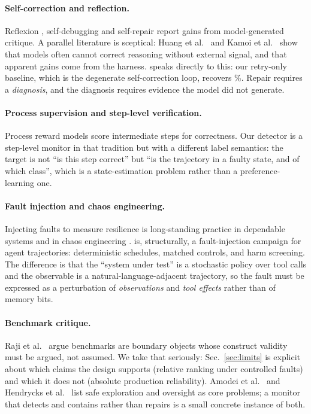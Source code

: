 \paragraph{Self-correction and reflection.} Reflexion \citep{shinn2023reflexion}, self-debugging
\citep{chen2024selfdebug} and self-repair \citep{olausson2024selfrepair} report gains from
model-generated critique. A parallel literature is sceptical: Huang et al.~\citep{huang2024selfcorrect} and Kamoi et al.~\citep{kamoi2024selfcorrection} show that models often cannot correct reasoning without external
signal, and that apparent gains come from the harness. \arb{} speaks directly to this: our
retry-only baseline, which is the degenerate self-correction loop, recovers \RecRetry\%. Repair
requires a \emph{diagnosis}, and the diagnosis requires evidence the model did not generate.

\paragraph{Process supervision and step-level verification.} Process reward models
\citep{lightman2023prm,uesato2022safety,cobbe2021gsm8k} score intermediate steps for correctness.
Our detector is a step-level monitor in that tradition but with a different label semantics: the
target is not ``is this step correct'' but ``is the trajectory in a faulty state, and of which
class'', which is a state-estimation problem rather than a preference-learning one.

\paragraph{Fault injection and chaos engineering.} Injecting faults to measure resilience is
long-standing practice in dependable systems \citep{hsueh1997fault,scully2015fault} and in chaos
engineering \citep{basiri2016chaos,lightstone2004chaos}. \arb{} is, structurally, a fault-injection
campaign for agent trajectories: deterministic schedules, matched controls, and harm screening. The
difference is that the ``system under test'' is a stochastic policy over tool calls and the
observable is a natural-language-adjacent trajectory, so the fault must be expressed as a
perturbation of \emph{observations} and \emph{tool effects} rather than of memory bits.

\paragraph{Benchmark critique.} Raji et al.~\citep{raji2021ai} argue benchmarks are boundary objects whose
construct validity must be argued, not assumed. We take that seriously: Sec.~\ref{sec:limits} is
explicit about which claims the design supports (relative ranking under controlled faults) and which
it does not (absolute production reliability). Amodei et al.~\citep{amodei2016concrete} and Hendrycks et al.~\citep{hendrycks2021ethics} list safe exploration and oversight as core problems; a monitor that
detects and contains rather than repairs is a small concrete instance of both.
